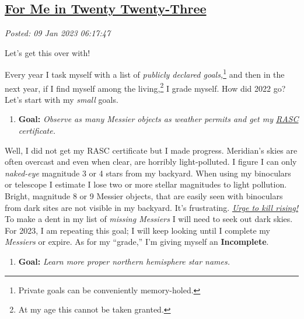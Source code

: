 %

\subsection*{\href{http://analyzethedatanotthedrivel.org/2023/01/08/for-me-in-twenty-twenty-three/}{For Me in Twenty Twenty-Three}}


\noindent\emph{Posted: 09 Jan 2023 06:17:47}
\vspace{6pt}

Let's get this over with!

Every year I task myself with a list of \emph{publicly declared
goals,}\footnote{Private goals can be conveniently
  memory-holed.} and %
then in the next year, if I find myself among the
living,\footnote{At my age this cannot be taken granted.
} I %
grade myself. How did 2022 go? Let's start with my \emph{small} goals.

\begin{enumerate}
\def\labelenumi{\arabic{enumi}.}
\item
  \textbf{Goal:} \emph{Observe as many Messier objects as weather
  permits and get my \href{https://rasc.ca/}{RASC} certificate.}
\end{enumerate}

Well, I did not get my RASC certificate but I made progress. Meridian's
skies are often overcast and even when clear, are horribly
light-polluted. I figure I can only \emph{naked-eye} magnitude 3 or 4
stars from my backyard. When using my binoculars or telescope I estimate
I lose two or more stellar magnitudes to light pollution. Bright,
magnitude 8 or 9 Messier objects, that are easily seen with binoculars
from dark sites are not visible in my backyard. It's frustrating.
\href{https://www.youtube.com/watch?v=VdO--3UL5D8}{\emph{Urge to kill rising!}} To make a dent in my list of \emph{missing
Messiers} I will need to seek out dark skies. For 2023, I am repeating
this goal; I will keep looking until I complete my \emph{Messiers} or
expire. As for my ``grade,'' I'm giving myself an \textbf{Incomplete}.

\begin{enumerate}
\def\labelenumi{\arabic{enumi}.}
\setcounter{enumi}{1}
\item
  \textbf{Goal:} \emph{Learn more proper northern hemisphere star
  names.}
\end{enumerate}

